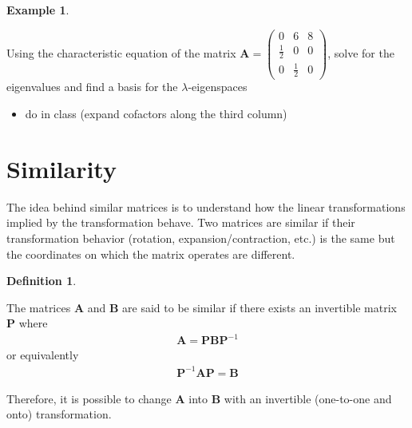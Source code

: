 \documentclass[
]{book}
\providecommand{\tightlist}{%
  \setlength{\itemsep}{0pt}\setlength{\parskip}{0pt}}
\theoremstyle{definition}
\newtheorem{definition}{Definition}[chapter]
\theoremstyle{definition}
\newtheorem{example}{Example}[chapter]
\theoremstyle{definition}
\theoremstyle{remark}
\begin{document}
\begin{example}
\protect\hypertarget{exm:unlabeled-div-173}{}\label{exm:unlabeled-div-173}

Using the characteristic equation of the matrix \(\mathbf{A} = \begin{pmatrix} 0 & 6 & 8 \\ \frac{1}{2} & 0 & 0 \\ 0 & \frac{1}{2} & 0 \end{pmatrix}\), solve for the eigenvalues and find a basis for the \(\lambda\)-eigenspaces

\begin{itemize}
\tightlist
\item
  do in class (expand cofactors along the third column)
\end{itemize}

\end{example}

\hypertarget{similarity}{%
\section{Similarity}\label{similarity}}

The idea behind similar matrices is to understand how the linear transformations implied by the transformation behave. Two matrices are similar if their transformation behavior (rotation, expansion/contraction, etc.) is the same but the coordinates on which the matrix operates are different.

\begin{definition}
\protect\hypertarget{def:unlabeled-div-174}{}\label{def:unlabeled-div-174}

The matrices \(\mathbf{A}\) and \(\mathbf{B}\) are said to be similar if there exists an invertible matrix \(\mathbf{P}\) where
\[
\begin{aligned}
\mathbf{A} = \mathbf{P} \mathbf{B} \mathbf{P}^{-1}
\end{aligned}
\]
or equivalently
\[
\begin{aligned}
\mathbf{P}^{-1} \mathbf{A} \mathbf{P}=  \mathbf{B} 
\end{aligned}
\]

\end{definition}

Therefore, it is possible to change \(\mathbf{A}\) into \(\mathbf{B}\) with an invertible (one-to-one and onto) transformation.
\end{document}
